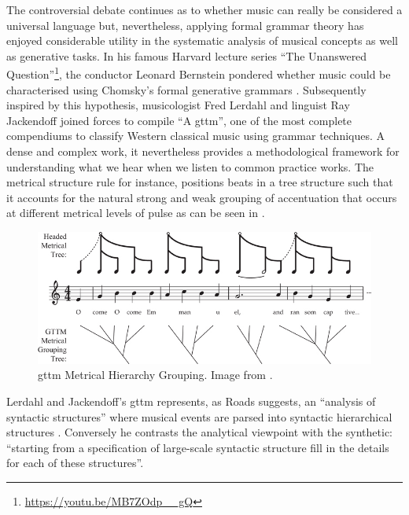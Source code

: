 The controversial debate continues as to whether music can really be considered a universal language \citep{Campbell1997, Savage2015} but, nevertheless, applying formal grammar theory has enjoyed considerable utility in the systematic analysis of musical concepts as well as generative tasks. In his famous Harvard lecture series ``The Unanswered Question''\footnote{\url{https://youtu.be/MB7ZOdp__gQ}}\citep{bernstein}, the conductor Leonard Bernstein pondered whether music could be characterised using Chomsky’s formal generative grammars \citep{Chomsky1957}. Subsequently inspired by this hypothesis, musicologist Fred Lerdahl and linguist Ray Jackendoff \citeyearpar{lerdahljackendoff} joined forces to compile ``A \acrfull{gttm}'', one of the most complete compendiums to classify Western classical music using grammar techniques. A dense and complex work, it nevertheless provides a methodological framework for understanding what we hear when we listen to common practice works. The metrical structure rule for instance, positions beats in a tree structure such that it accounts for the natural strong and weak grouping of accentuation that occurs at different metrical levels of pulse as can be seen in .

\begin{figure}
	\begin{center}
		\includegraphics[width=\figSizeHundred]{ch03_symbolic/figures/metricalhierarchy.jpg}
	\end{center}
	\caption[Generative Theory of Tonal Music Metrical Hierarchy Grouping]{\acrshort{gttm} Metrical Hierarchy Grouping. Image from \cite{Fitch2013}.}
	\label{fig:gttm}
\end{figure}

Lerdahl and Jackendoff’s \acrshort{gttm} represents, as Roads suggests, an “analysis of syntactic structures” where musical events are parsed into syntactic hierarchical structures \citep{Roads1996}. Conversely he contrasts the analytical viewpoint with the synthetic: “starting from a specification of large-scale syntactic structure fill in the details for each of these structures”.


